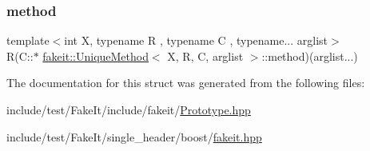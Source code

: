 \subsubsection{\texorpdfstring{method}{method}}
{\footnotesize\ttfamily template$<$int X, typename R , typename C , typename... arglist$>$ \\
R(C\+::$\ast$ \mbox{\hyperlink{structfakeit_1_1UniqueMethod}{fakeit\+::\+Unique\+Method}}$<$ X, R, C, arglist $>$\+::method)(arglist...)}



The documentation for this struct was generated from the following files\+:\begin{DoxyCompactItemize}
\item 
include/test/\+Fake\+It/include/fakeit/\mbox{\hyperlink{Prototype_8hpp}{Prototype.\+hpp}}\item 
include/test/\+Fake\+It/single\+\_\+header/boost/\mbox{\hyperlink{single__header_2boost_2fakeit_8hpp}{fakeit.\+hpp}}\end{DoxyCompactItemize}
